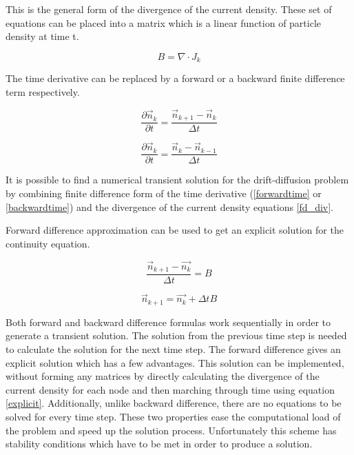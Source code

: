 \begin{doublespace}
This is the general form of the divergence of the current density. These set of equations can be placed into a matrix which is a linear function of particle density at time t.

\begin{equation}
B = \nabla \cdot J_k 
\label{fd_div}
\end{equation}

The time derivative can be replaced by a forward or a backward finite difference term respectively.

\begin{equation}
\frac{\partial  \vec{n}_k}{\partial t}=\frac{ \vec{n}_{k+1}-\vec{n}_k}{\Delta t}
\label{forwardtime}
\end{equation}

\begin{equation}
\frac{\partial \vec{n}_k}{\partial t}=\frac{ \vec{n}_k- \vec{n}_{k-1}}{\Delta t}
\label{backwardtime}
\end{equation}

It is possible to find a numerical transient solution for the drift-diffusion problem by combining finite difference form of the time derivative (\eqref{forwardtime} or \eqref{backwardtime}) and the divergence of the current density equations \eqref{fd_div}.

Forward difference approximation can be used to get an explicit solution for the continuity equation\cite{Dragica1}.

\begin{equation}\nonumber
\frac{ \vec{n}_{k+1}-\vec{n_k}}{\Delta t}=B
\end{equation}

\begin{equation}
\vec{n}_{k+1}=\vec{n_{k}}+\Delta t B
\label{explicit}
\end{equation}

Both forward and backward difference formulas work sequentially in order to generate a transient solution. The solution from the previous time step is needed to calculate the solution for the next time step. The forward difference gives an explicit solution which has a few advantages. This solution can be implemented, without forming any matrices by directly calculating the divergence of the current density for each node and then marching through time using equation \ref{explicit}. Additionally, unlike backward difference, there are no equations to be solved for every time step. These two properties ease the computational load of the problem and speed up the solution process. Unfortunately this scheme has stability conditions which have to be met in order to produce a solution\cite{Dragica1}.


\end{doublespace}
